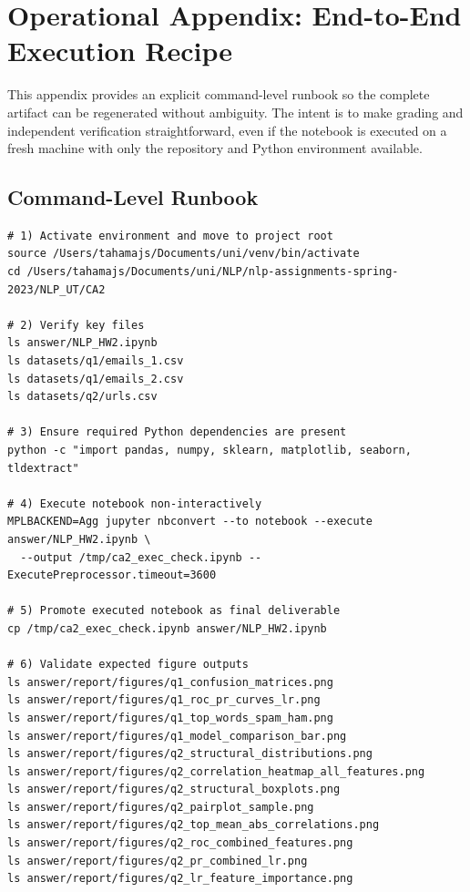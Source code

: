 \section{Operational Appendix: End-to-End Execution Recipe}

This appendix provides an explicit command-level runbook so the complete artifact can be regenerated without ambiguity. The intent is to make grading and independent verification straightforward, even if the notebook is executed on a fresh machine with only the repository and Python environment available.

\subsection{Command-Level Runbook}

\begin{lstlisting}[basicstyle=\ttfamily\scriptsize,frame=single]
# 1) Activate environment and move to project root
source /Users/tahamajs/Documents/uni/venv/bin/activate
cd /Users/tahamajs/Documents/uni/NLP/nlp-assignments-spring-2023/NLP_UT/CA2

# 2) Verify key files
ls answer/NLP_HW2.ipynb
ls datasets/q1/emails_1.csv
ls datasets/q1/emails_2.csv
ls datasets/q2/urls.csv

# 3) Ensure required Python dependencies are present
python -c "import pandas, numpy, sklearn, matplotlib, seaborn, tldextract"

# 4) Execute notebook non-interactively
MPLBACKEND=Agg jupyter nbconvert --to notebook --execute answer/NLP_HW2.ipynb \
  --output /tmp/ca2_exec_check.ipynb --ExecutePreprocessor.timeout=3600

# 5) Promote executed notebook as final deliverable
cp /tmp/ca2_exec_check.ipynb answer/NLP_HW2.ipynb

# 6) Validate expected figure outputs
ls answer/report/figures/q1_confusion_matrices.png
ls answer/report/figures/q1_roc_pr_curves_lr.png
ls answer/report/figures/q1_top_words_spam_ham.png
ls answer/report/figures/q1_model_comparison_bar.png
ls answer/report/figures/q2_structural_distributions.png
ls answer/report/figures/q2_correlation_heatmap_all_features.png
ls answer/report/figures/q2_structural_boxplots.png
ls answer/report/figures/q2_pairplot_sample.png
ls answer/report/figures/q2_top_mean_abs_correlations.png
ls answer/report/figures/q2_roc_combined_features.png
ls answer/report/figures/q2_pr_combined_lr.png
ls answer/report/figures/q2_lr_feature_importance.png


\end{lstlisting}
